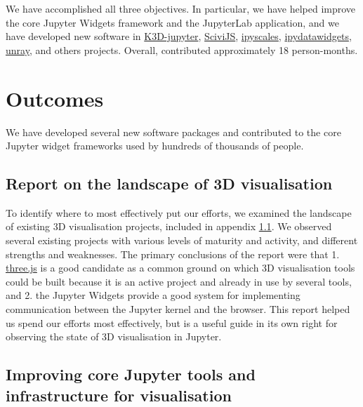 \documentclass{deliverablereport}
\begin{document}
We have accomplished all three objectives. In particular, we have helped improve the
core Jupyter Widgets framework and the JupyterLab application, and we have
developed new software in
\href{https://github.com/K3D-tools/K3D-jupyter}{K3D-jupyter},
\href{https://demo.logilab.fr/SciviJS/}{SciviJS},
\href{https://github.com/vidartf/ipyscales}{ipyscales},
\href{https://github.com/vidartf/ipydatawidgets}{ipydatawidgets},
\href{https://github.com/vidartf/unray}{unray},
and others projects.
Overall, \ODK contributed approximately 18 person-months.




\section{Outcomes}

We have developed several new software packages and contributed to the core Jupyter widget frameworks used by hundreds of thousands of people.

\subsection{Report on the landscape of 3D visualisation}\label{landscape}

To identify where to most effectively put our efforts,
we examined the landscape of existing 3D visualisation projects,
included in appendix \ref{landscape}.
We observed several existing projects with various levels of maturity and activity, and different strengths and weaknesses.
The primary conclusions of the report were that 1. \href{https://threejs.org}{three.js} is a good candidate as a common ground on which 3D visualisation tools could be built because it is an active project and already in use by several tools, and 2. the Jupyter Widgets provide a good system for implementing communication between the Jupyter kernel and the browser.
This report helped us spend our efforts most effectively,
but is a useful guide in its own right for observing the state
of 3D visualisation in Jupyter.


\subsection{Improving core Jupyter tools and infrastructure for visualisation}\label{improving-core}
\end{document}
